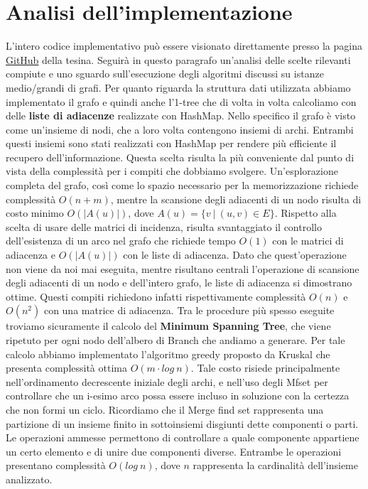 \documentclass[
	article,			%
	12pt,				%
	oneside,			%
	a4paper,			%
	english,			%
	italian,				%
	sumario=tradicional,
	]{abntex2}
\begin{document}
\section{Analisi dell'implementazione}
L'intero codice implementativo può essere visionato direttamente presso la pagina \href{https://github.com/LorenzoSciandra/TesinaOttimizzazioneCombinatoria}{GitHub} della tesina. Seguirà in questo paragrafo un'analisi delle scelte rilevanti compiute e uno sguardo sull'esecuzione degli algoritmi discussi su istanze medio/grandi di grafi.
\newline
Per quanto riguarda la struttura dati utilizzata abbiamo implementato il grafo e quindi anche l'1-tree che di volta in volta calcoliamo con delle \textbf{liste di adiacenze} realizzate con HashMap. Nello specifico il grafo è visto come un'insieme di nodi, che a loro volta contengono insiemi di archi. Entrambi questi insiemi sono stati realizzati con HashMap per rendere più efficiente il recupero dell'informazione. Questa scelta risulta la più conveniente dal punto di vista della complessità per i compiti che dobbiamo svolgere. Un'esplorazione completa del grafo, così come lo spazio necessario per la memorizzazione richiede complessità $O(n+m)$, mentre la scansione degli adiacenti di un nodo risulta di costo minimo $O(|A(u)|)$, dove $A(u) = \{v \:|\: (u,v) \in E\}$.
\newline
Rispetto alla scelta di usare delle matrici di incidenza, risulta svantaggiato il controllo dell'esistenza di un arco nel grafo che richiede tempo $O(1)$ con le matrici di adiacenza e $O(|A(u)|)$ con le liste di adiacenza. Dato che quest'operazione non viene da noi mai eseguita, mentre risultano centrali l'operazione di scansione degli adiacenti di un nodo e dell'intero grafo, le liste di adiacenza si dimostrano ottime. Questi compiti richiedono infatti rispettivamente complessità $O(n)$ e $O(n^2)$ con una matrice di adiacenza. 
\newline
\newline
Tra le procedure più spesso eseguite troviamo sicuramente il calcolo del \textbf{Minimum Spanning Tree}, che viene ripetuto per ogni nodo dell'albero di Branch che andiamo a generare. Per tale calcolo abbiamo implementato l'algoritmo greedy proposto da Kruskal che presenta complessità ottima $O(m \cdot log\:n)$. Tale costo risiede principalmente nell'ordinamento decrescente iniziale degli archi, e nell'uso degli Mfset per controllare che un i-esimo arco possa essere incluso in soluzione con la certezza che non formi un ciclo. Ricordiamo che il Merge find set rappresenta una partizione di un insieme finito in sottoinsiemi disgiunti dette componenti o parti. Le operazioni ammesse permettono di controllare a quale componente appartiene un certo elemento e di unire due componenti diverse. Entrambe le operazioni presentano complessità $O(log\: n)$, dove $n$ rappresenta la cardinalità dell'insieme analizzato.
\end{document}
